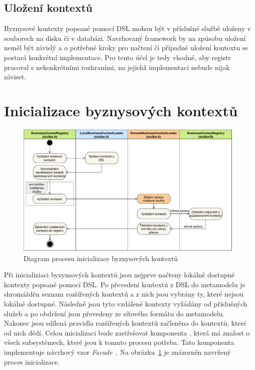 \subsection{Uložení kontextů}

Byznysové kontexty popsané pomocí \gls{DSL} mohou být v příslušné službě uloženy v souborech na disku či v
databázi. Navrhovaný framework by na způsobu uložení neměl být závislý a o potřebné kroky
pro načtení či případně uložení kontextu se postará konkrétní implementace. Pro tento účel
je tedy vhodné, aby registr pracoval s nekonkrétními rozhraními, na jejichž implementaci
nebude nijak záviset.

\section{Inicializace byznysových kontextů}

\begin{figure}
    \centering
    \includegraphics[keepaspectratio=true, width=\linewidth]{figures/business-context-loading.pdf}
    \caption{Diagram procesu inicializace byznysov\'ych kontextů}
    \label{fig:business-context-loading}
\end{figure}

Při inicializiaci byzynsových kontextů jsou nejprve načteny lokálně dostupné kontexty popsané pomocí \gls{DSL}.
Po převedení kontextů z \gls{DSL} do metamodelu je shromážděn seznam rozšířených kontextů a z nich jsou vybrány ty,
které nejsou lokálně dostupné. Následně jsou tyto vzdálené kontexty vyžádány od příslušných služeb
a po obdržení jsou převedeny ze síťového formátu do metamodelu. Nakonec jsou sdílená pravidla rozšířených kontextů začleněna
do kontextů, které od nich dědí. Celou inicializaci bude zastřešovat komponenta , která
má znalost o všech subsystémech, které jsou k tomuto procesu potřeba. Tato komponenta implementuje
návrhový vzor \textit{Facade}~\cite{fowler2002patterns}. Na obrázku~\ref{fig:business-context-loading} je znázorněn
navržený proces inicializace.


